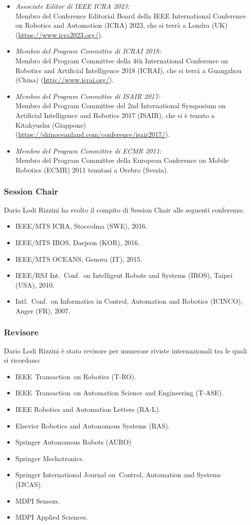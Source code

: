 \documentclass[11pt]{article}
\newcommand{\ITEMDATE}[1]{\item \textit{#1:}\\}
\begin{document}
\begin{itemize}
\ITEMDATE{Associate Editor di IEEE ICRA 2023}
Membro del Conference Editorial Board della IEEE International Conference on Robotics and Automation (ICRA) 2023,  
che si terr\`a a Londra (UK) ({\footnotesize \url{https://www.icra2023.org/}}).
\ITEMDATE{Membro del Program Committee di ICRAI 2018}
Membro del Program Committee della 4th International Conference on Robotics and Artificial Intelligence 2018 (ICRAI),  
che si terr\`a a Guangzhou (China) ({\footnotesize \url{http://www.icrai.org/}}). 
\ITEMDATE{Membro del Program Committee di ISAIR 2017}
Membro del Program Committee del 2nd International Symposium on Artificial Intelligence and Robotics 2017 (ISAIR),  
che si \`e tenuto a Kitakyushu (Giappone) \\
({\footnotesize \url{https://shinoceanland.com/conference/isair2017/}}). 
\ITEMDATE{Membro del Program Committee di ECMR 2011}
Membro del Program Committee della European Conference on Mobile Robotics (ECMR) 2011
tenutasi a Orebro (Svezia). 
\end{itemize}


\subsubsection*{Session Chair}

Dario Lodi Rizzini ha svolto il compito di Session Chair alle seguenti conferenze.
\begin{itemize}
\item IEEE/MTS ICRA, Stoccolma (SWE), 2016. 
\item IEEE/MTS IROS, Daejeon (KOR), 2016. 
\item IEEE/MTS OCEANS, Genova (IT), 2015. 
\item IEEE/RSJ Int.~Conf.~on Intelligent Robots and Systems (IROS), Taipei (USA), 2010.
\item Intl.~Conf.~on Informatics in Control, Automation and Robotics (ICINCO), Anger (FR), 2007.
\end{itemize}


\subsubsection*{Revisore}

Dario Lodi Rizzini \`e stato revisore per numerose riviste internazionali tra le quali si ricordano:
\begin{itemize}
\item IEEE~Transaction~on Robotics (T-RO).
\item IEEE~Transaction~on Automation Science and Engineering (T-ASE).
\item IEEE Robotics and Automation Letters (RA-L). 
\item Elsevier Robotics and Autonomous Systems (RAS).
\item Springer Autonomous Robots (AURO)
\item Springer Mechatronics.
\item Springer International Journal on~Control, Automation and Systems (IJCAS).
\item MDPI Sensors. 
\item MDPI Applied Sciences. 
\end{itemize}
\end{document}
